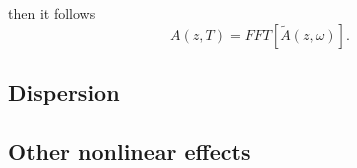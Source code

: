         then it follows
        \begin{equation} \label{eq_deffft}
                A(z,T) = FFT \left[ \tilde{A}(z,\omega) \right].
            \end{equation}
            
            
    
   
        \subsection{Dispersion}
        
        
        
        \subsection{Other nonlinear effects}


